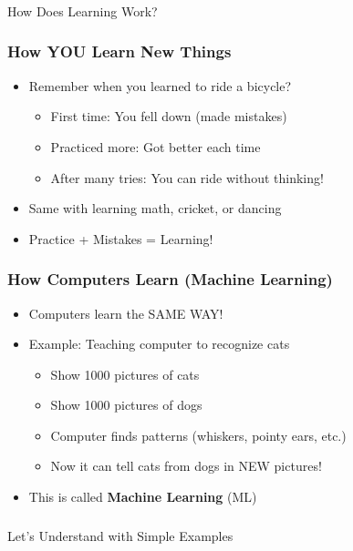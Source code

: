 \begin{frame}[fragile]\frametitle{}
\begin{center}
{\Large How Does Learning Work?}
\end{center}
\end{frame}

\begin{frame}[fragile]\frametitle{How YOU Learn New Things}
\begin{itemize}
\item Remember when you learned to ride a bicycle?
\begin{itemize}
\item First time: You fell down (made mistakes)
\item Practiced more: Got better each time
\item After many tries: You can ride without thinking!
\end{itemize}
\item Same with learning math, cricket, or dancing
\item Practice + Mistakes = Learning!
\end{itemize}
\end{frame}

\begin{frame}[fragile]\frametitle{How Computers Learn (Machine Learning)}
\begin{itemize}
\item Computers learn the SAME WAY!
\item Example: Teaching computer to recognize cats
\begin{itemize}
\item Show 1000 pictures of cats
\item Show 1000 pictures of dogs
\item Computer finds patterns (whiskers, pointy ears, etc.)
\item Now it can tell cats from dogs in NEW pictures!
\end{itemize}
\item This is called {\bf Machine Learning} (ML)
\end{itemize}
\end{frame}

\begin{frame}[fragile]\frametitle{}
\begin{center}
{\Large Let's Understand with Simple Examples}
\end{center}
\end{frame}

